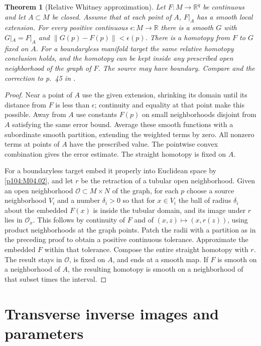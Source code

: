 \documentclass[11pt,oneside,openany]{book}
\newtheorem{theorem}{Theorem}[chapter]
\theoremstyle{definition}
\theoremstyle{remark}
\newcommand{\R}{\mathbb R}
\begin{document}
\begin{theorem}[Relative Whitney approximation]\label{p104:M04.05}
Let \(F:M\to\R^q\) be continuous and let \(A\subset M\) be closed. Assume that at each point of \(A\), \(F|_A\) has a smooth local extension. For every positive continuous \(\epsilon:M\to\R\) there is a smooth \(G\) with \(G|_A=F|_A\) and \(\lVert G(p)-F(p)\rVert<\epsilon(p)\). There is a homotopy from \(F\) to \(G\) fixed on \(A\). For a boundaryless manifold target the same relative homotopy conclusion holds, and the homotopy can be kept inside any prescribed open neighborhood of the graph of \(F\). The source may have boundary. Compare \cite[Theorems 6.21, 6.26--6.27]{lee} and the correction to p.\ 45 in \cite{leeerrata}.
\end{theorem}
\begin{proof}
Near a point of \(A\) use the given extension, shrinking its domain until its distance from \(F\) is less than \(\epsilon\); continuity and equality at that point make this possible. Away from \(A\) use constants \(F(p)\) on small neighborhoods disjoint from \(A\) satisfying the same error bound. Average these smooth functions with a subordinate smooth partition, extending the weighted terms by zero. All nonzero terms at points of \(A\) have the prescribed value. The pointwise convex combination gives the error estimate. The straight homotopy is fixed on \(A\).

For a boundaryless target embed it properly into Euclidean space by \cref{p104:M04.02}, and let \(r\) be the retraction of a tubular open neighborhood. Given an open neighborhood \(\mathcal O\subset M\times N\) of the graph, for each \(p\) choose a source neighborhood \(V_i\) and a number \(\delta_i>0\) so that for \(x\in V_i\) the ball of radius \(\delta_i\) about the embedded \(F(x)\) is inside the tubular domain, and its image under \(r\) lies in \(\mathcal O_x\). This follows by continuity of \(F\) and of \((x,z)\mapsto (x,r(z))\), using product neighborhoods at the graph points. Patch the radii with a partition as in the preceding proof to obtain a positive continuous tolerance. Approximate the embedded \(F\) within that tolerance. Compose the entire straight homotopy with \(r\). The result stays in \(\mathcal O\), is fixed on \(A\), and ends at a smooth map. If \(F\) is smooth on a neighborhood of \(A\), the resulting homotopy is smooth on a neighborhood of that subset times the interval.
\end{proof}

\section{Transverse inverse images and parameters}
\end{document}
